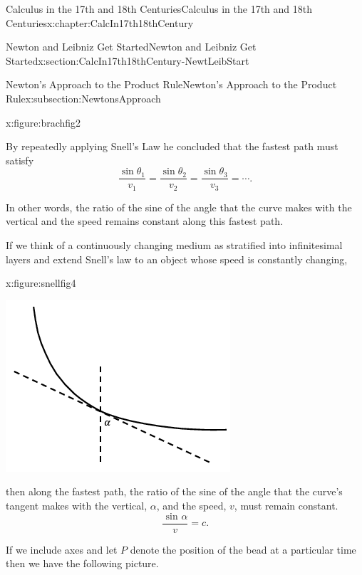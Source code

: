 \begin{chapterptx}{Calculus in the 17th and 18th Centuries}{}{Calculus in the 17th and 18th Centuries}{}{}{x:chapter:CalcIn17th18thCentury}
\begin{sectionptx}{Newton and Leibniz Get Started}{}{Newton and Leibniz Get Started}{}{}{x:section:CalcIn17th18thCentury-NewtLeibStart}
\begin{subsectionptx}{Newton's Approach to the Product Rule}{}{Newton's Approach to the Product Rule}{}{}{x:subsection:NewtonsApproach}
\begin{figureptx}{}{x:figure:brachfig2}{}
\begin{image}{0.125}{0.75}{0.125}
				\end{image}%
				\tcblower
			\end{figureptx}%
			By repeatedly applying Snell's Law he concluded that the fastest path must satisfy%
			\begin{equation*}
				\frac{\sin \theta_1}{v_1}=\frac{\sin \theta_2}{v_2}=\frac{\sin\theta_3}{v_3}=\cdots\text{.}
			\end{equation*}
			\par
			In other words, the ratio of the sine of the angle that the curve makes with the vertical and the speed remains constant along this fastest path.%
			\par
			If we think of a continuously changing medium as stratified into infinitesimal layers and extend Snell's law to an object whose speed is constantly changing,%
			\begin{figureptx}{}{x:figure:snellfig4}{}%
				\begin{image}{0.125}{0.75}{0.125}%
					\includegraphics[width=\linewidth]{external/images/snellfig4.png}
				\end{image}%
				\tcblower
			\end{figureptx}%
			then along the fastest path, the ratio of the sine of the angle that the curve's tangent makes with the vertical, \(\alpha\), and the speed, \(v\), must remain constant.%
			\begin{equation*}
				\frac{\text{ sin } \alpha}{v}=c\text{.}
			\end{equation*}
			\par
			If we include axes and let \(P\) denote the position of the bead at a particular time then we have the following picture.%

\end{subsectionptx}
\end{sectionptx}
\end{chapterptx}
